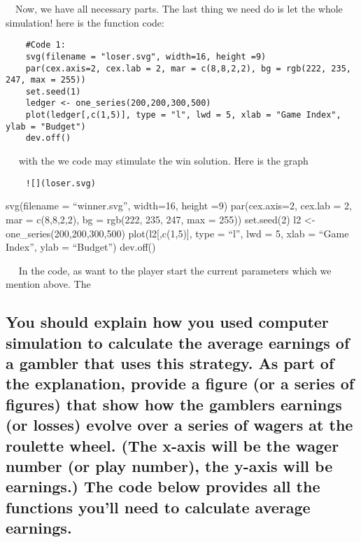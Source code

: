 \documentclass[
]{article}
\begin{document}
 Now, we have all necessary parts. The last thing we need do is let the
whole simulation! here is the function code:

\begin{verbatim}
    #Code 1:
    svg(filename = "loser.svg", width=16, height =9)
    par(cex.axis=2, cex.lab = 2, mar = c(8,8,2,2), bg = rgb(222, 235, 247, max = 255))
    set.seed(1)
    ledger <- one_series(200,200,300,500)
    plot(ledger[,c(1,5)], type = "l", lwd = 5, xlab = "Game Index", ylab = "Budget")
    dev.off()
\end{verbatim}

  with the we code may stimulate the win solution. Here is the graph

\begin{verbatim}
    ![](loser.svg)
\end{verbatim}

svg(filename = ``winner.svg'', width=16, height =9) par(cex.axis=2,
cex.lab = 2, mar = c(8,8,2,2), bg = rgb(222, 235, 247, max = 255))
set.seed(2) l2 \textless- one\_series(200,200,300,500)
plot(l2{[},c(1,5){]}, type = ``l'', lwd = 5, xlab = ``Game Index'', ylab
= ``Budget'') dev.off()

  In the code, as want to the player start the current parameters which
we mention above. The

\hypertarget{you-should-explain-how-you-used-computer-simulation-to-calculate-the-average-earnings-of-a-gambler-that-uses-this-strategy.-as-part-of-the-explanation-provide-a-figure-or-a-series-of-figures-that-show-how-the-gamblers-earnings-or-losses-evolve-over-a-series-of-wagers-at-the-roulette-wheel.-the-x-axis-will-be-the-wager-number-or-play-number-the-y-axis-will-be-earnings.-the-code-below-provides-all-the-functions-youll-need-to-calculate-average-earnings.}{%
\subsection{You should explain how you used computer simulation to
calculate the average earnings of a gambler that uses this strategy. As
part of the explanation, provide a figure (or a series of figures) that
show how the gamblers earnings (or losses) evolve over a series of
wagers at the roulette wheel. (The x-axis will be the wager number (or
play number), the y-axis will be earnings.) The code below provides all
the functions you'll need to calculate average
earnings.}\label{you-should-explain-how-you-used-computer-simulation-to-calculate-the-average-earnings-of-a-gambler-that-uses-this-strategy.-as-part-of-the-explanation-provide-a-figure-or-a-series-of-figures-that-show-how-the-gamblers-earnings-or-losses-evolve-over-a-series-of-wagers-at-the-roulette-wheel.-the-x-axis-will-be-the-wager-number-or-play-number-the-y-axis-will-be-earnings.-the-code-below-provides-all-the-functions-youll-need-to-calculate-average-earnings.}}
\end{document}
